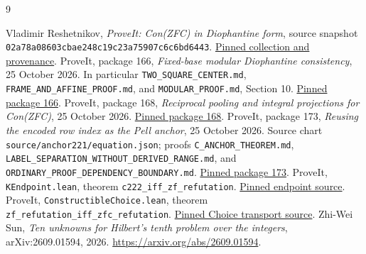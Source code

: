 \documentclass[10pt,letterpaper]{article}
\theoremstyle{definition}\newtheorem{definition}[theorem]{Definition}
\theoremstyle{remark}\newtheorem{remark}[theorem]{Remark}
\newcommand{\pin}{\texttt{02a78a08603cbae248c19c23a75907c6c6bd6443}}
\begin{document}
\begin{thebibliography}{9}
\raggedright
{} Vladimir Reshetnikov, \emph{ProveIt: Con(ZFC) in
Diophantine form}, source snapshot \pin.
\href{https://github.com/VladimirReshetnikov/ProveIt/tree/02a78a08603cbae248c19c23a75907c6c6bd6443/Computability/DiophantineConsistency/con-zfc-diophantine-forms}{Pinned collection and provenance}.
 ProveIt, package 166, \emph{Fixed-base modular
Diophantine consistency}, 25 October 2026. In particular
\texttt{TWO\_SQUARE\_CENTER.md}, \texttt{FRAME\_AND\_AFFINE\_PROOF.md},
and \texttt{MODULAR\_PROOF.md}, Section 10.
\href{https://github.com/VladimirReshetnikov/ProveIt/tree/02a78a08603cbae248c19c23a75907c6c6bd6443/Computability/DiophantineConsistency/con-zfc-diophantine-forms/166-fixed-base-modular}{Pinned package 166}.
 ProveIt, package 168, \emph{Reciprocal pooling and
integral projections for Con(ZFC)}, 25 October 2026.
\href{https://github.com/VladimirReshetnikov/ProveIt/tree/02a78a08603cbae248c19c23a75907c6c6bd6443/Computability/DiophantineConsistency/con-zfc-diophantine-forms/168-reciprocal-pooling}{Pinned package 168}.
 ProveIt, package 173, \emph{Reusing the encoded row
index as the Pell anchor}, 25 October 2026. Source chart
\texttt{source/anchor221/equation.json}; proofs
\texttt{C\_ANCHOR\_THEOREM.md},
\texttt{LABEL\_SEPARATION\_WITHOUT\_DERIVED\_RANGE.md}, and
\texttt{ORDINARY\_PROOF\_DEPENDENCY\_BOUNDARY.md}.
\href{https://github.com/VladimirReshetnikov/ProveIt/tree/02a78a08603cbae248c19c23a75907c6c6bd6443/Computability/DiophantineConsistency/con-zfc-diophantine-forms/173-crt-index-anchor-215}{Pinned package 173}.
 ProveIt, \texttt{KEndpoint.lean}, theorem
\texttt{c222\_iff\_zf\_refutation}.
\href{https://github.com/VladimirReshetnikov/ProveIt/blob/02a78a08603cbae248c19c23a75907c6c6bd6443/Computability/BusyBeaver/Lean/BusyBeaver/ZFC/KEndpoint.lean}{Pinned endpoint source}.
 ProveIt, \texttt{ConstructibleChoice.lean}, theorem
\texttt{zf\_refutation\_iff\_zfc\_refutation}.
\href{https://github.com/VladimirReshetnikov/ProveIt/blob/02a78a08603cbae248c19c23a75907c6c6bd6443/Computability/BusyBeaver/Lean/BusyBeaver/ZFC/ConstructibleChoice.lean}{Pinned Choice transport source}.
 Zhi-Wei Sun, \emph{Ten unknowns for Hilbert's tenth problem
over the integers}, arXiv:2609.01594, 2026.
\url{https://arxiv.org/abs/2609.01594}.
\end{thebibliography}
\end{document}

